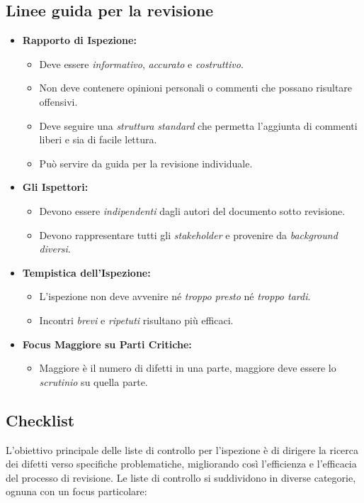 \subsection{Linee guida per la revisione}
\begin{itemize}
    \item \textbf{Rapporto di Ispezione:}
    \begin{itemize}
        \item Deve essere \textit{informativo}, \textit{accurato} e \textit{costruttivo}.
        \item Non deve contenere opinioni personali o commenti che possano risultare 
        offensivi.
        \item Deve seguire una \textit{struttura standard} che permetta l'aggiunta 
        di commenti liberi e sia di facile lettura.
        \item Può servire da guida per la revisione individuale.
    \end{itemize}
    
    \item \textbf{Gli Ispettori:}
    \begin{itemize}
        \item Devono essere \textit{indipendenti} dagli autori del documento sotto 
        revisione.
        \item Devono rappresentare tutti gli \textit{stakeholder} e provenire da 
        \textit{background diversi}.
    \end{itemize}
    
    \item \textbf{Tempistica dell'Ispezione:}
    \begin{itemize}
        \item L'ispezione non deve avvenire né \textit{troppo presto} né 
        \textit{troppo tardi}.
        \item Incontri \textit{brevi} e \textit{ripetuti} risultano più efficaci.
    \end{itemize}
    
    \item \textbf{Focus Maggiore su Parti Critiche:}
    \begin{itemize}
        \item Maggiore è il numero di difetti in una parte, maggiore deve essere 
        lo \textit{scrutinio} su quella parte.
    \end{itemize}
\end{itemize}
\subsection{Checklist}
L'obiettivo principale delle liste di controllo per l'ispezione è di dirigere 
la ricerca dei difetti verso specifiche problematiche, migliorando così 
l'efficienza e l'efficacia del processo di revisione. Le liste di controllo 
si suddividono in diverse categorie, ognuna con un focus particolare:

